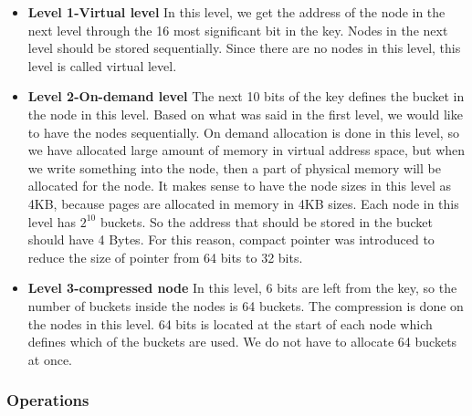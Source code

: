 \documentclass[12pt]{report}
\begin{document}
\begin{itemize}
 
 \item \textbf{Level 1-Virtual level} In this level, we get the address of the node in the next level through the 16 most significant bit in the key. Nodes in the next level should be stored sequentially. Since there are no nodes in this level, this level is called virtual level.
 \item \textbf{Level 2-On-demand level} The next 10 bits of the key defines the bucket in the node in this level. Based on what was said in the first level, we would like to have the nodes sequentially. On demand allocation is done in this level, so we have allocated large amount of memory in virtual address space, but when we write something into the node, then a part of physical memory will be allocated for the node. It makes sense to have the node sizes in this level as 4KB, because pages are allocated in memory in 4KB sizes. Each node in this level has ${2}^{10}$ buckets. So the address that should be stored in the bucket should have 4 Bytes. For this reason, compact pointer was introduced to reduce the size of pointer from 64 bits to 32 bits.
  
 \item \textbf{Level 3-compressed node} In this level, 6 bits are left from the key, so the number of buckets inside the nodes is 64 buckets. The compression is done on the nodes in this level. 64 bits is located at the start of each node which defines which of the buckets are used. We do not have to allocate 64 buckets at once. 
 
\end{itemize}    

\subsubsection{Operations}
\end{document}
